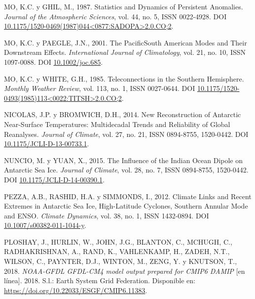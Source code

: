 \documentclass[12pt,oneside,a4paper]{reedthesis}
\newlength{\cslhangindent}
\newenvironment{CSLReferences}[2] %
 {%
  \setlength{\parindent}{0pt}
  \ifodd #1 \everypar{\setlength{\hangindent}{\cslhangindent}}\ignorespaces\fi
  \ifnum #2 > 0
  \setlength{\parskip}{#2\baselineskip}
  \fi
 }%
 {}
\begin{document}
\begin{CSLReferences}{1}{0}
\leavevmode{}%
MO, K.C. y GHIL, M., 1987. Statistics and {Dynamics} of {Persistent Anomalies}. \emph{Journal of the Atmospheric Sciences}, vol. 44, no. 5, ISSN 0022-4928. DOI \href{https://doi.org/10.1175/1520-0469(1987)044\%3C0877:SADOPA\%3E2.0.CO;2}{10.1175/1520-0469(1987)044\textless0877:SADOPA\textgreater2.0.CO;2}.

\leavevmode{}%
MO, K.C. y PAEGLE, J.N., 2001. The {Pacific}{\textendash}{South American} Modes and Their Downstream Effects. \emph{International Journal of Climatology}, vol. 21, no. 10, ISSN 1097-0088. DOI \href{https://doi.org/10.1002/joc.685}{10.1002/joc.685}.

\leavevmode{}%
MO, K.C. y WHITE, G.H., 1985. Teleconnections in the {Southern Hemisphere}. \emph{Monthly Weather Review}, vol. 113, no. 1, ISSN 0027-0644. DOI \href{https://doi.org/10.1175/1520-0493(1985)113\%3C0022:TITSH\%3E2.0.CO;2}{10.1175/1520-0493(1985)113\textless0022:TITSH\textgreater2.0.CO;2}.

\leavevmode{}%
NICOLAS, J.P. y BROMWICH, D.H., 2014. New {Reconstruction} of {Antarctic Near-Surface Temperatures}: {Multidecadal Trends} and {Reliability} of {Global Reanalyses}. \emph{Journal of Climate}, vol. 27, no. 21, ISSN 0894-8755, 1520-0442. DOI \href{https://doi.org/10.1175/JCLI-D-13-00733.1}{10.1175/JCLI-D-13-00733.1}.

\leavevmode{}%
NUNCIO, M. y YUAN, X., 2015. The {Influence} of the {Indian Ocean Dipole} on {Antarctic Sea Ice}. \emph{Journal of Climate}, vol. 28, no. 7, ISSN 0894-8755, 1520-0442. DOI \href{https://doi.org/10.1175/JCLI-D-14-00390.1}{10.1175/JCLI-D-14-00390.1}.

\leavevmode{}%
PEZZA, A.B., RASHID, H.A. y SIMMONDS, I., 2012. Climate Links and Recent Extremes in Antarctic Sea Ice, High-Latitude Cyclones, {Southern Annular Mode} and {ENSO}. \emph{Climate Dynamics}, vol. 38, no. 1, ISSN 1432-0894. DOI \href{https://doi.org/10.1007/s00382-011-1044-y}{10.1007/s00382-011-1044-y}.

\leavevmode{}%
PLOSHAY, J., HURLIN, W., JOHN, J.G., BLANTON, C., MCHUGH, C., RADHAKRISHNAN, A., RAND, K., VAHLENKAMP, H., ZADEH, N.T., WILSON, C., PAYNTER, D.J., WINTON, M., ZENG, Y. y KNUTSON, T., 2018. \emph{NOAA-GFDL GFDL-CM4 model output prepared for CMIP6 DAMIP} {[}en línea{]}. 2018. S.l.: Earth System Grid Federation. Disponible en: \url{https://doi.org/10.22033/ESGF/CMIP6.11383}.


\end{CSLReferences}
\end{document}
